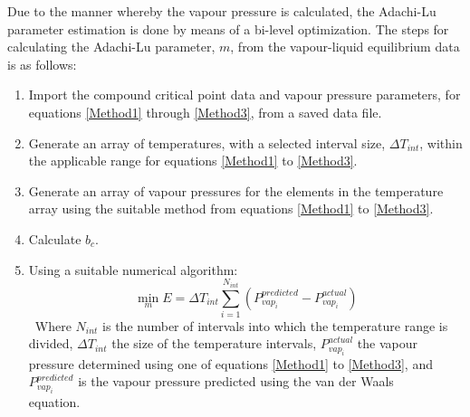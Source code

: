Due to the manner whereby the vapour pressure is calculated, the Adachi-Lu parameter estimation is done by means of a bi-level optimization. The steps for calculating the Adachi-Lu parameter, $m$, from the vapour-liquid equilibrium data is as follows:\
\begin{enumerate}
\item Import the compound critical point data and vapour pressure parameters, for equations \ref{Method1} through \ref{Method3}, from a saved data file.\
\item Generate an array of temperatures, with a selected interval size, $\Delta T_{int}$, within the applicable range for equations \ref{Method1} to \ref{Method3}.\label{TrangeStep}\
\item Generate an array of vapour pressures for the elements in the temperature array using the suitable method from equations \ref{Method1} to \ref{Method3}.\
\item Calculate $b_{c}$.\
\item Using a suitable numerical algorithm:\label{mOptimization}\
\begin{equation}
\min_{m} E = \Delta T_{int}\sum_{i =1}^{N_{int}} \left(P_{vap_{i}}^{predicted} - P_{vap_{i}}^{actual}\right) \label{mGoalFunction}
\end{equation}\
Where $N_{int}$ is the number of intervals into which the temperature range is divided, $\Delta T_{int}$ the size of the temperature intervals, $P_{vap_{i}}^{actual}$ the vapour pressure determined using one of equations \ref{Method1} to \ref{Method3}, and $P_{vap_{i}}^{predicted}$ is the vapour pressure predicted using the van der Waals equation.\
\
\
\
\


\end{enumerate}
